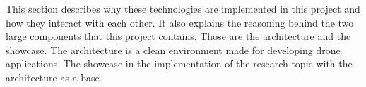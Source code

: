 This section describes why these technologies are implemented in this project and how they interact with each other. It also explains the reasoning behind the two large components that this project contains. Those are the architecture and the showcase. The architecture is a clean environment made for developing drone applications. The showcase in the implementation of the research topic with the architecture as a base.